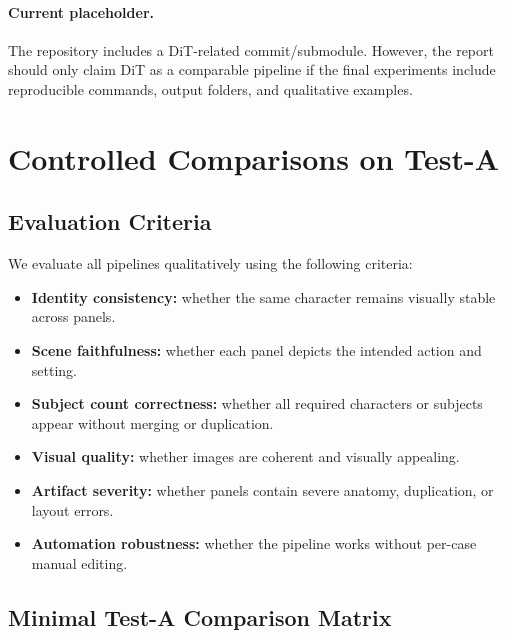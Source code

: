 \documentclass[11pt,a4paper]{article}
\begin{document}
\paragraph{Current placeholder.}
The repository includes a DiT-related commit/submodule. However, the report should only claim DiT as a comparable pipeline if the final experiments include reproducible commands, output folders, and qualitative examples.

\section{Controlled Comparisons on Test-A}
\label{sec:experiments}

\subsection{Evaluation Criteria}

We evaluate all pipelines qualitatively using the following criteria:

\begin{itemize}[leftmargin=*]
    \item \textbf{Identity consistency:} whether the same character remains visually stable across panels.
    \item \textbf{Scene faithfulness:} whether each panel depicts the intended action and setting.
    \item \textbf{Subject count correctness:} whether all required characters or subjects appear without merging or duplication.
    \item \textbf{Visual quality:} whether images are coherent and visually appealing.
    \item \textbf{Artifact severity:} whether panels contain severe anatomy, duplication, or layout errors.
    \item \textbf{Automation robustness:} whether the pipeline works without per-case manual editing.
\end{itemize}

\subsection{Minimal Test-A Comparison Matrix}
\end{document}
